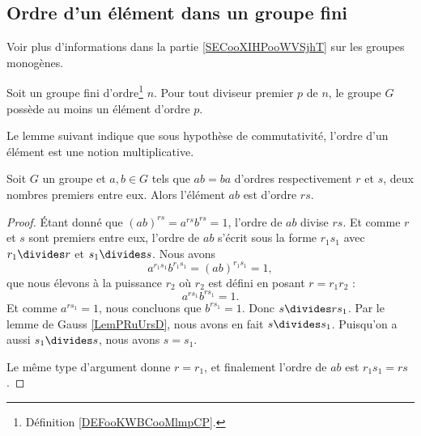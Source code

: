 \subsection{Ordre d'un élément dans un groupe fini}

Voir plus d'informations dans la partie \ref{SECooXIHPooWVSjhT} sur les groupes monogènes.

\begin{theorem}    \label{THOooSUWKooICbzqM}
	Soit un groupe fini d'ordre\footnote{Définition \ref{DEFooKWBCooMlmpCP}.} \( n\). Pour tout diviseur premier \( p\) de \( n\), le groupe \( G\) possède au moins un élément d'ordre \( p\).
\end{theorem}

Le lemme suivant indique que sous hypothèse de commutativité, l'ordre d'un élément est une notion multiplicative.
\begin{lemma}    \label{LemyETtdy}
	Soit \( G\) un groupe et \( a,b\in G\) tels que \( ab=ba\) d'ordres respectivement \( r\) et \( s\), deux nombres premiers entre eux. Alors l'élément \( ab\) est d'ordre \( rs\).
\end{lemma}

\begin{proof}
	Étant donné que \( (ab)^{rs}=a^{rs}b^{rs}=1\), l'ordre de \( ab\) divise \( rs\). Et comme \( r\) et \( s\) sont premiers entre eux, l'ordre de \( ab\) s'écrit sous la forme \( r_1s_1\) avec \( r_1\divides r\) et \( s_1\divides s\). Nous avons
	\begin{equation}
		a^{r_1s_1}b^{r_1s_1}=(ab)^{r_1s_1}=1,
	\end{equation}
	que nous élevons à la puissance \( r_2\) où \( r_2\) est défini en posant \(r=r_1r_2\) :
	\begin{equation}
		a^{rs_1}b^{rs_1}=1.
	\end{equation}
	Et comme \( a^{rs_1}=1\), nous concluons que \( b^{rs_1}=1\). Donc \( s\divides rs_1\). Par le lemme de Gauss \ref{LemPRuUrsD}, nous avons en fait \( s\divides s_1\). Puisqu'on a aussi \( s_1\divides s\), nous avons \( s=s_1\).

	Le même type d'argument donne \( r=r_1\), et finalement l'ordre de \( ab\) est \( r_1s_1=rs\).
\end{proof}


